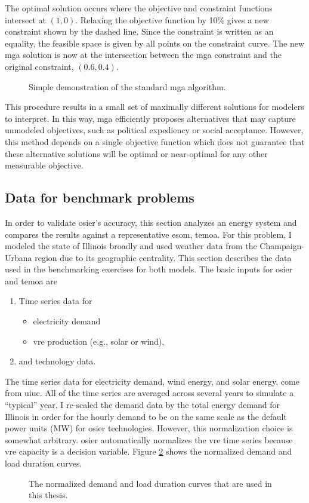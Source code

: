 The optimal solution occurs where the objective and constraint functions
intersect at $\left(1,0\right)$. Relaxing the objective function by 10\% gives a
new constraint shown by the dashed line. Since the constraint is written as an
equality, the feasible space is given by all points on the constraint curve. The
new \ac{mga} solution is now at the intersection between the \ac{mga} constraint and the
original constraint, $\left(0.6, 0.4\right)$.

\begin{figure}[h]
  \centering
  \resizebox{0.75\columnwidth}{!}{}
  \caption{Simple demonstration of the standard \ac{mga} algorithm.}
  \label{fig:standard_mga}
\end{figure}
\FloatBarrier

This procedure results in a small set of maximally different solutions for
modelers to interpret. In this way, \ac{mga} efficiently proposes alternatives
that may capture unmodeled objectives, such as political expediency or social
acceptance. However, this method depends on a single objective function which
does not guarantee that these alternative solutions will be optimal or
near-optimal for any other measurable objective.

\subsection{Data for benchmark problems}
 In order to validate \ac{osier}'s accuracy, this section analyzes an energy
system and compares the results against a representative \ac{esom}, \ac{temoa}.
For this problem, I modeled the state of Illinois broadly and used
weather data from the Champaign-Urbana region due to its geographic centrality.
This section describes the data used in the benchmarking exercises for both models. 
The basic inputs for \ac{osier} and \ac{temoa} are
\begin{enumerate}
    \item Time series data for
    \begin{itemize}
      \item electricity demand
      \item \ac{vre} production (e.g., solar or wind),
    \end{itemize} 
    \item and technology data.
\end{enumerate}
\noindent
The time series data for electricity demand, wind energy, and solar energy, come
from \ac{uiuc}. All of the time series are averaged across several years to
simulate a ``typical'' year. I re-scaled the demand data by the total energy
demand for Illinois in order for the hourly demand to be on the same scale as
the default power units (MW) for \ac{osier} technologies. However, this
normalization choice is somewhat arbitrary. \ac{osier} automatically normalizes
the \ac{vre} time series because \ac{vre} capacity is a decision variable.
Figure \ref{fig:normalized_ldc} shows the normalized demand and load duration
curves.


 \begin{figure}[h]
  \centering
  \resizebox{1\columnwidth}{!}{}
  \caption{The normalized demand and load duration curves that are used in this thesis.}
  \label{fig:normalized_ldc}
\end{figure}

\FloatBarrier